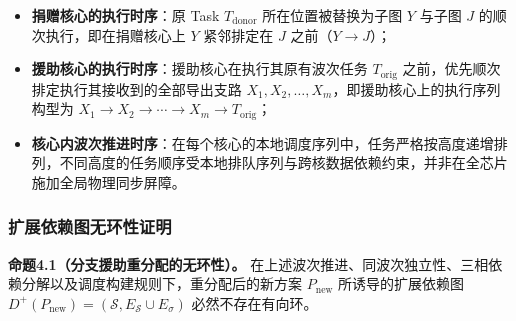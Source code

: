 \documentclass[anonymous,withtoc]{gmcm2026}
\providecommand{\tightlist}{\setlength{\itemsep}{0pt}\setlength{\parskip}{0pt}}
\begin{document}
\begin{itemize}
\tightlist
\item
  \textbf{捐赠核心的执行时序}：原 Task \(T_{\mathrm{donor}}\) 所在位置被替换为子图 \(Y\) 与子图 \(J\) 的顺次执行，即在捐赠核心上 \(Y\) 紧邻排定在 \(J\) 之前（\(Y \to J\)）；
\item
  \textbf{援助核心的执行时序}：援助核心在执行其原有波次任务 \(T_{\mathrm{orig}}\) 之前，优先顺次排定执行其接收到的全部导出支路 \(X_1, X_2, \dots, X_m\)，即援助核心上的执行序列构型为 \(X_1 \to X_2 \to \cdots \to X_m \to T_{\mathrm{orig}}\)；
\item
  \textbf{核心内波次推进时序}：在每个核心的本地调度序列中，任务严格按高度递增排列，不同高度的任务顺序受本地排队序列与跨核数据依赖约束，并非在全芯片施加全局物理同步屏障。
\end{itemize}

\subsubsection{扩展依赖图无环性证明}

\textbf{命题4.1（分支援助重分配的无环性）。} 在上述波次推进、同波次独立性、三相依赖分解以及调度构建规则下，重分配后的新方案 \(P_{\mathrm{new}}\) 所诱导的扩展依赖图 \(D^+(P_{\mathrm{new}}) = (\mathcal{S}, E_{\mathcal{S}} \cup E_\sigma)\) 必然不存在有向环。
\end{document}
